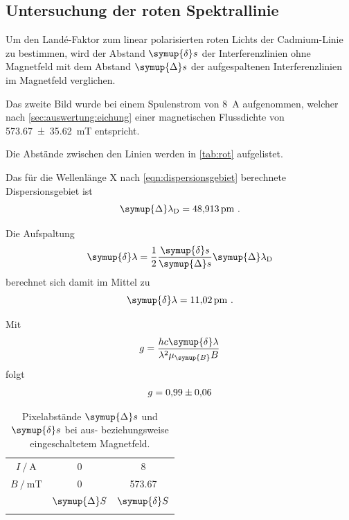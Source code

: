\subsection{Untersuchung der roten Spektrallinie}
Um den Landé-Faktor zum linear polarisierten roten Lichts der Cadmium-Linie zu bestimmen,
wird der Abstand $\symup{\delta} s$ der Interferenzlinien ohne Magnetfeld
mit dem Abstand $\symup{\Delta} s$ der aufgespaltenen Interferenzlinien im Magnetfeld verglichen.


Das zweite Bild wurde bei einem Spulenstrom von \SI{8}{\ampere} aufgenommen,
welcher nach \autoref{sec:auswertung:eichung} einer magnetischen Flussdichte von \SI{573.67 \pm 35.62}{\milli\tesla} entspricht.

Die Abstände zwischen den Linien werden in \autoref{tab:rot} aufgelistet.

Das für die Wellenlänge X nach \autoref{eqn:dispersionsgebiet} berechnete Dispersionsgebiet ist
\[
    \symup{\Delta}\lambda_\text{D} = \SI{48.913}{\pico\meter} \ .
\]

Die Aufspaltung
\[
    \symup{\delta} \lambda = \frac{1}{2} \frac{\symup{\delta} s}{\symup{\Delta} s} \symup{\Delta} \lambda_\text{D}
\]
berechnet sich damit im Mittel zu
\[
    \symup{\delta} \lambda = \SI{11.02}{\pico\meter} \ .
\]

Mit
\[
    g = \frac{hc \symup{\delta} \lambda}{\lambda^2 \mu_{\symup{B}} B}
\]
folgt
\[
    g = \num{0.99 \pm 0.06}
\]


\begin{table}
    \centering
    \caption{Pixelabstände $\symup{\Delta} s$ und $\symup{\delta} s$ bei aus- beziehungsweise eingeschaltetem Magnetfeld.}
    \label{tab:rot}
    \begin{tabular}{S S S}
        \toprule
        {$I \mathbin{/} \si{\ampere}$} & 0 & 8 \\
        {$B \mathbin{/} \si{\milli\tesla}$} & 0 & 573.67  \\
        \midrule
        & {$\symup{\Delta} S$} & {$\symup{\delta} S$} \\
        \midrule
        \bottomrule
    \end{tabular}
\end{table}


